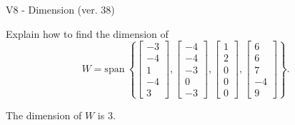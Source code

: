 \begin{exercise}
  \begin{exerciseTitle}V8 - Dimension (ver. 38)\end{exerciseTitle}
  \begin{exerciseStatement}
    Explain how to find the dimension of 
\[W=\mathrm{span}\ \left\{\left[\begin{array}{r}
-3 \\
-4 \\
1 \\
-4 \\
3
\end{array}\right] , \left[\begin{array}{r}
-4 \\
-4 \\
-3 \\
0 \\
-3
\end{array}\right] , \left[\begin{array}{r}
1 \\
2 \\
0 \\
0 \\
0
\end{array}\right] , \left[\begin{array}{r}
6 \\
6 \\
7 \\
-4 \\
9
\end{array}\right]\right\}.\]



  \end{exerciseStatement}
  \begin{exerciseAnswer}
   The dimension of \(W\) is  \(3\).
  


  \end{exerciseAnswer}
\end{exercise}